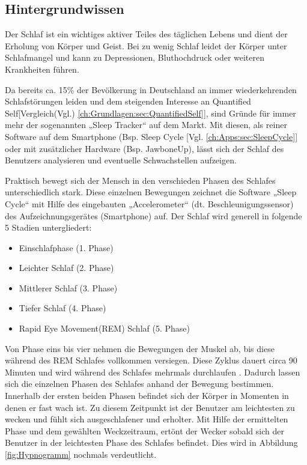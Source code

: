 \subsection{Hintergrundwissen}
\label{ch:Apps:sec:Sleepcycle:subsec:H}

Der Schlaf ist ein wichtiges aktiver Teiles des täglichen Lebens und dient der Erholung von Körper und Geist.
Bei zu wenig Schlaf leidet der Körper unter Schlafmangel und kann zu Depressionen, Bluthochdruck oder weiteren Krankheiten führen\cite{Chen:SleepMonitoring}. 

Da bereits ca. 15\% der Bevölkerung in Deutschland an immer wiederkehrenden Schlafstörungen leiden und dem steigenden Interesse an Quantified Self[Vergleich(Vgl.) \ref{ch:Grundlagen:sec:QuantifiedSelf}], sind Gründe für immer mehr der sogenannten „Sleep Tracker“ auf dem Markt. %
Mit diesen, als reiner Software auf dem Smartphone (Bsp. Sleep Cycle [Vgl. \ref{ch:Apps:sec:SleepCycle}] oder mit zusätzlicher Hardware (Bsp. JawboneUp), lässt sich der Schlaf des Benutzers analysieren und eventuelle Schwachstellen aufzeigen.

Praktisch bewegt sich der Mensch in den verschieden Phasen des Schlafes unterschiedlich stark.
Diese einzelnen Bewegungen zeichnet die Software „Sleep Cycle“ mit Hilfe des eingebauten „Accelerometer“ (dt. Beschleunigungssensor) des Aufzeichnungsgerätes (Smartphone) auf.
Der Schlaf wird generell in folgende 5 Stadien untergliedert:

\begin{itemize}
	\item Einschlafphase (1. Phase)
	\item Leichter Schlaf (2. Phase)
	\item Mittlerer Schlaf (3. Phase)
	\item Tiefer Schlaf (4. Phase)
	\item Rapid Eye Movement(REM) Schlaf (5. Phase)
\end{itemize}

Von Phase eins bis vier nehmen die Bewegungen der Muskel ab, bis diese während des REM Schlafes vollkommen versiegen.
Diese Zyklus dauert circa 90 Minuten und wird während des Schlafes mehrmals durchlaufen \cite{Medicine:Schlaf}.
Dadurch lassen sich die einzelnen Phasen des Schlafes anhand der Bewegung bestimmen. \\
Innerhalb der ersten beiden Phasen befindet sich der Körper in Momenten in denen er fast wach ist. 
Zu diesem Zeitpunkt ist der Benutzer am leichtesten zu wecken und fühlt sich ausgeschlafener und erholter.
Mit Hilfe der ermittelten Phase und dem gewählten Weckzeitraum, ertönt der Wecker sobald sich der Benutzer in der leichtesten Phase des Schlafes befindet. 
Dies wird in Abbildung \ref{fig:Hypnogramm} nochmals verdeutlicht.

